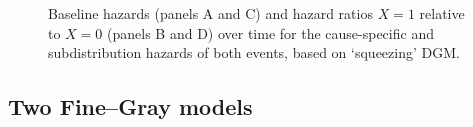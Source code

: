 \documentclass[
  letterpaper,
  paper=240mm:170mm,
  twoside=true,
  open=right,
  fontsize=10pt,
  pagesize=false,
  BCOR=15mm,
  DIV=14,
  headinclude=true,
  footinclude=false,
  headsepline=on]{scrbook}
\begin{document}
\begin{figure}


\caption{\label{fig-squeeze}Baseline hazards (panels A and C) and hazard
ratios \(X = 1\) relative to \(X = 0\) (panels B and D) over time for
the cause-specific and subdistribution hazards of both events, based on
`squeezing' DGM.}

\end{figure}%

\subsection{Two Fine--Gray models}\label{two-finegray-models}
\end{document}
